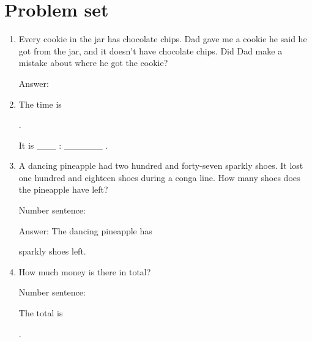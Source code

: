 \documentclass{tufte-book}
\begin{document}
\clearpage\section{Problem set }

\begin{enumerate}

\item Every cookie in the jar has chocolate chips. Dad gave me a cookie he said he got from the jar, and it doesn't have chocolate chips.
Did Dad make a mistake about where he got the cookie?\medskip\par
Answer: \dotfill\medskip

\item {}
The time is \dotfill\medskip\par\dotfill\medskip.\par
It is \_\_\_ : \_\_\_\_\_\_ . \bigskip\par

\item A dancing pineapple had two hundred and forty-seven sparkly shoes. It lost one hundred and eighteen shoes during a conga line. How many shoes does the pineapple have left?\medskip\par
Number sentence: \dotfill\medskip\par
Answer: The dancing pineapple has 
\dotfill\medskip\par\mbox{}\dotfill\medskip\par\mbox{}\dotfill\bigskip
 sparkly shoes left.

\item {}
How much money is there in total?\medskip

Number sentence: \dotfill\medskip

The total is \dotfill\medskip\par\mbox{}\dotfill\medskip.\par

\end{enumerate}
\end{document}
